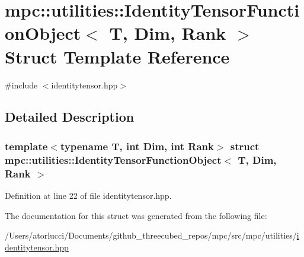 \hypertarget{structmpc_1_1utilities_1_1_identity_tensor_function_object}{}\section{mpc\+:\+:utilities\+:\+:Identity\+Tensor\+Function\+Object$<$ T, Dim, Rank $>$ Struct Template Reference}
\label{structmpc_1_1utilities_1_1_identity_tensor_function_object}


{\ttfamily \#include $<$identitytensor.\+hpp$>$}



\subsection{Detailed Description}
\subsubsection*{template$<$typename T, int Dim, int Rank$>$\newline
struct mpc\+::utilities\+::\+Identity\+Tensor\+Function\+Object$<$ T, Dim, Rank $>$}



Definition at line 22 of file identitytensor.\+hpp.



The documentation for this struct was generated from the following file\+:\begin{DoxyCompactItemize}
\item 
/\+Users/atorlucci/\+Documents/github\+\_\+threecubed\+\_\+repos/mpc/src/mpc/utilities/\mbox{\hyperlink{identitytensor_8hpp}{identitytensor.\+hpp}}\end{DoxyCompactItemize}
